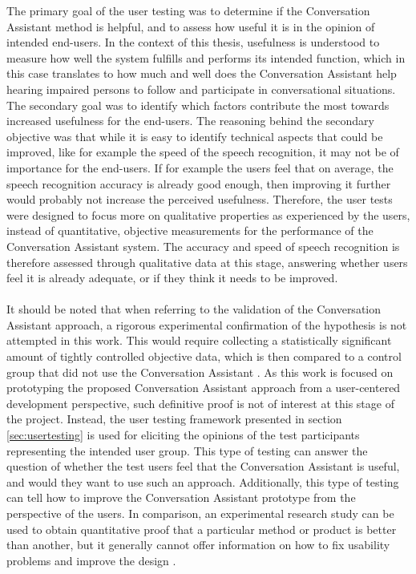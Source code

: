 \documentclass[english, 12pt, a4paper, pdftex, elec, utf8]{aaltothesis}
\begin{document}
The primary goal of the user testing was to determine if the Conversation Assistant method is helpful, and to assess how useful it is in the opinion of intended end-users. In the context of this thesis, usefulness is understood to measure how well the system fulfills and performs its intended function, which in this case translates to how much and well does the Conversation Assistant help hearing impaired persons to follow and participate in conversational situations. The secondary goal was to identify which factors contribute the most towards increased usefulness for the end-users. The reasoning behind the secondary objective was that while it is easy to identify technical aspects that could be improved, like for example the speed of the speech recognition, it may not be of importance for the end-users. If for example the users feel that on average, the speech recognition accuracy is already good enough, then improving it further would probably not increase the perceived usefulness. Therefore, the user tests were designed to focus more on qualitative properties as experienced by the users, instead of quantitative, objective measurements for the performance of the Conversation Assistant system. The accuracy and speed of speech recognition is therefore assessed through qualitative data at this stage, answering whether users feel it is already adequate, or if they think it needs to be improved. \\\\
It should be noted that when referring to the validation of the Conversation Assistant approach, a rigorous experimental confirmation of the hypothesis is not attempted in this work. This would require collecting a statistically significant amount of tightly controlled objective data, which is then compared to a control group that did not use the Conversation Assistant \cite[p.~23--24]{richter2014user}. As this work is focused on prototyping the proposed Conversation Assistant approach from a user-centered development perspective, such definitive proof is not of interest at this stage of the project. Instead, the user testing framework presented in section \ref{sec:usertesting} is used for eliciting the opinions of the test participants representing the intended user group. This type of testing can answer the question of whether the test users feel that the Conversation Assistant is useful, and would they want to use such an approach. Additionally, this type of testing can tell how to improve the Conversation Assistant prototype from the perspective of the users. In comparison, an experimental research study can be used to obtain quantitative proof that a particular method or product is better than another, but it generally cannot offer information on how to fix usability problems and improve the design \cite[p.~24--25]{richter2014user}. \\\\
\end{document}
